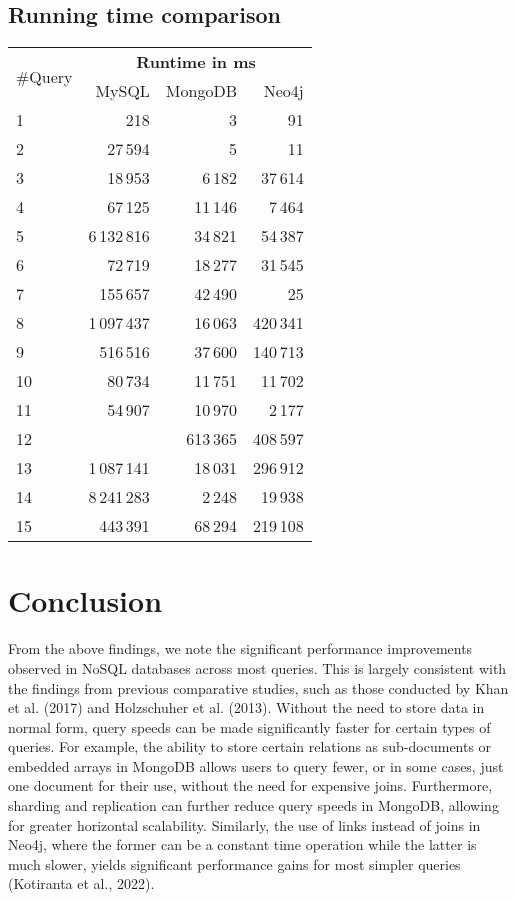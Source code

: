 \documentclass[10pt,titlepage]{article}
\begin{document}
\subsection{Running time comparison}

\begin{center}
\begin{tabular}{|l|r|r|r|}
\hline
\multirow{2}{*}{\#Query} & \multicolumn{3}{|c|}{\textbf{Runtime in ms}} \\ \cline{2-4}
& MySQL & MongoDB & Neo4j \\
\hline
1 &  218 & 3 & 91 \\
\hline
2 & 27\,594  & 5  & 11 \\
\hline
3 & 18\,953  & 6\,182  & 37\,614   \\
\hline
4 & 67\,125  & 11\,146  & 7\,464   \\
\hline
5 &  6\,132\,816 & 34\,821  & 54\,387   \\
\hline
6 & 72\,719  & 18\,277  & 31\,545   \\
\hline
7 & 155\,657  & 42\,490  & 25 \\
\hline
8 & 1\,097\,437  & 16\,063  & 420\,341  \\
\hline
9 &  516\,516 & 37\,600  & 140\,713   \\
\hline
10 &  80\,734 & 11\,751  & 11\,702   \\
\hline
11 & 54\,907  & 10\,970  & 2\,177 \\
\hline
12 &   & 613\,365  & 408\,597   \\
\hline
13 & 1\,087\,141  & 18\,031  & 296\,912 \\
\hline
14 & 8\,241\,283  & 2\,248  & 19\,938   \\
\hline
15 & 443\,391  & 68\,294  & 219\,108  \\
\hline
\end{tabular}
\end{center}

\section{Conclusion}

From the above findings, we note the significant performance improvements observed in NoSQL databases across most queries. This is largely consistent with the findings from previous comparative studies, such as those conducted by Khan et al. (2017) and Holzschuher et al. (2013). Without the need to store data in normal form, query speeds can be made significantly faster for certain types of queries. For example, the ability to store certain relations as sub-documents or embedded arrays in MongoDB allows users to query fewer, or in some cases, just one document for their use, without the need for expensive joins. Furthermore, sharding and replication can further reduce query speeds in MongoDB, allowing for greater horizontal scalability. Similarly, the use of links instead of joins in Neo4j, where the former can be a constant time operation while the latter is much slower, yields significant performance gains for most simpler queries (Kotiranta et al., 2022). 
\end{document}
